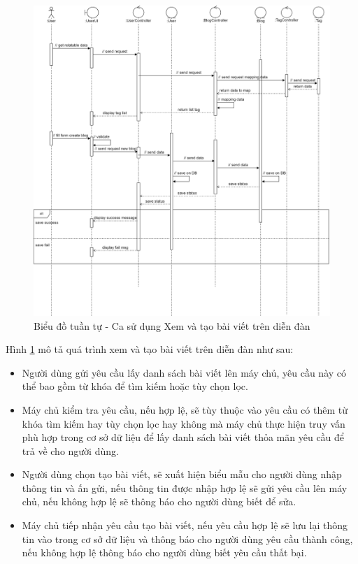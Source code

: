 \documentclass[./../main.tex]{subfiles}
\begin{document}
\begin{figure}[H]
	\centering
	\includegraphics[width=\linewidth]{./img/uc15.png}
	\caption{\label{tab:seq-uc10}Biểu đồ tuần tự - Ca sử dụng Xem và tạo bài viết trên diễn đàn}
\end{figure}

Hình \ref{tab:seq-uc10} mô tả quá trình xem và tạo bài viết trên diễn đàn như sau:
\begin{itemize}
    \item Người dùng gửi yêu cầu lấy danh sách bài viết lên máy chủ, yêu cầu này có thể bao gồm từ khóa để tìm kiếm hoặc tùy chọn lọc.
    \item Máy chủ kiểm tra yêu cầu, nếu hợp lệ, sẽ tùy thuộc vào yêu cầu có thêm từ khóa tìm kiếm hay tùy chọn lọc hay không mà máy chủ thực hiện truy vấn phù hợp trong cơ sở dữ liệu để lấy danh sách bài viết thỏa mãn yêu cầu để trả về cho người dùng.
    \item Người dùng chọn tạo bài viết, sẽ xuất hiện biểu mẫu cho người dùng nhập thông tin và ấn gửi, nếu thông tin được nhập hợp lệ sẽ gửi yêu cầu lên máy chủ, nếu không hợp lệ sẽ thông báo cho người dùng biết để sửa.
    \item Máy chủ tiếp nhận yêu cầu tạo bài viết, nếu yêu cầu hợp lệ sẽ lưu lại thông tin vào trong cơ sở dữ liệu và thông báo cho người dùng yêu cầu thành công, nếu không hợp lệ thông báo cho người dùng biết yêu cầu thất bại.
\end{itemize}
\end{document}
